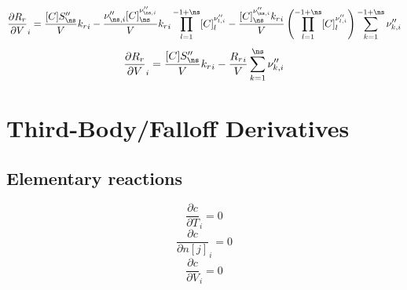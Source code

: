\documentclass[a4paper,10pt]{article}
\begin{document}
\begin{dmath} \frac{\partial {R_r} }{\partial V }_{i} = \frac{[C] S^{\prime\prime}_{\ns}}{V} {k_r}_{i} - \frac{\nu^{\prime\prime}_{\ns,i} [C]_{\ns}^{\nu^{\prime\prime}_{\ns,i}}}{V} {k_r}_{i} \prod_{l=1}^{-1 + \ns} [C]_{l}^{\nu^{\prime\prime}_{l,i}} - \frac{[C]_{\ns}^{\nu^{\prime\prime}_{\ns,i}} {k_r}_{i}}{V} \left(\prod_{l=1}^{-1 + \ns} [C]_{l}^{\nu^{\prime\prime}_{l,i}}\right) \sum_{k=1}^{-1 + \ns} \nu^{\prime\prime}_{k,i}\end{dmath} 
\begin{dmath} \frac{\partial {R_r} }{\partial V }_{i} = \frac{[C] S^{\prime\prime}_{\ns}}{V} {k_r}_{i} - \frac{{R_r}_{i}}{V} \sum_{k=1}^{\ns} \nu^{\prime\prime}_{k,i}\end{dmath} 
\section{Third-Body\slash Falloff Derivatives}
\subsection{Elementary reactions
}
\begin{dmath} \frac{\partial c }{\partial T }_{i} = 0\end{dmath} 
\begin{dmath} \frac{\partial c }{\partial n[j] }_{i} = 0\end{dmath} 
\begin{dmath} \frac{\partial c }{\partial V }_{i} = 0\end{dmath} 
\end{document}
